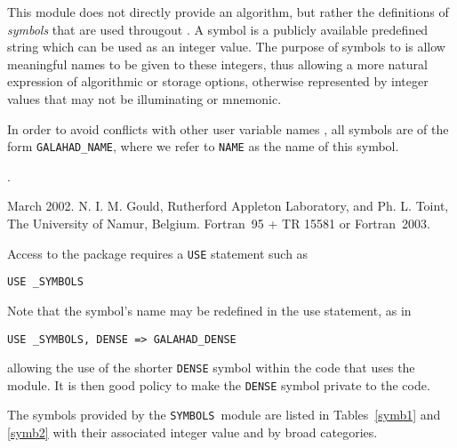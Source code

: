 \documentclass{galahad}
\newcommand{\packagename}{SYMBOLS}
\newcommand{\fullpackagename}{\libraryname\_\packagename}
\begin{document}
\galheader


\galsummary

This module does not directly provide an algorithm, but rather the definitions
of \emph{symbols} that are used througout \libraryname . A symbol is a
publicly available predefined string which can be used as an integer value.
The purpose of symbols to is allow meaningful names to be given to these
integers, thus allowing a more natural expression of algorithmic or storage
options, otherwise represented by integer values that may not be illuminating
or mnemonic.

\noindent
In order to avoid conflicts with other user variable names , all symbols are
of the form {\tt GALAHAD\_NAME}, where we refer to {\tt NAME} as the name of
this symbol.

\galattributes
\galversions{\tt  \fullpackagename}.

\galdate March 2002.
\galorigin N. I. M. Gould, Rutherford Appleton Laboratory, and
Ph. L. Toint, The University of Namur, Belgium.
\gallanguage Fortran~95 + TR 15581 or Fortran~2003. 


\galhowto

Access to the package requires a {\tt USE} statement such as

\hspace{8mm} {\tt USE \fullpackagename}

\noindent
Note that the symbol's name may be redefined in the use statement, as in 

\hspace{8mm} {\tt USE \fullpackagename, DENSE => GALAHAD\_DENSE}

\noindent
allowing the use of the shorter {\tt DENSE} symbol within the code that uses
the module. It is then good policy to make the {\tt DENSE} symbol private to
the code.


\galsymbols

The symbols provided by the {\tt \packagename}\ module are listed in
Tables~\ref{symb1} and \ref{symb2} with their associated integer value and by
broad categories.
\end{document}
